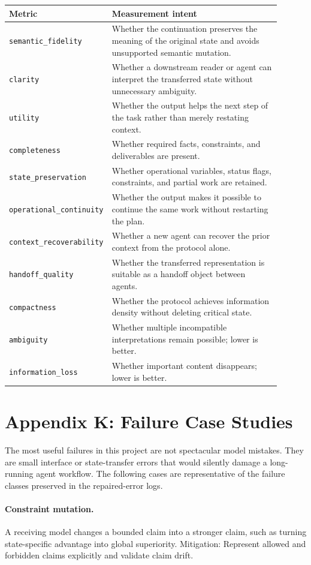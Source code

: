 \documentclass[11pt]{article}
\begin{document}
\begin{longtable}{p{0.28\linewidth}p{0.62\linewidth}}
\toprule
Metric & Measurement intent \\
\midrule
\endhead
\texttt{semantic\_fidelity} & Whether the continuation preserves the meaning of the original state and avoids unsupported semantic mutation. \\
\texttt{clarity} & Whether a downstream reader or agent can interpret the transferred state without unnecessary ambiguity. \\
\texttt{utility} & Whether the output helps the next step of the task rather than merely restating context. \\
\texttt{completeness} & Whether required facts, constraints, and deliverables are present. \\
\texttt{state\_preservation} & Whether operational variables, status flags, constraints, and partial work are retained. \\
\texttt{operational\_continuity} & Whether the output makes it possible to continue the same work without restarting the plan. \\
\texttt{context\_recoverability} & Whether a new agent can recover the prior context from the protocol alone. \\
\texttt{handoff\_quality} & Whether the transferred representation is suitable as a handoff object between agents. \\
\texttt{compactness} & Whether the protocol achieves information density without deleting critical state. \\
\texttt{ambiguity} & Whether multiple incompatible interpretations remain possible; lower is better. \\
\texttt{information\_loss} & Whether important content disappears; lower is better. \\
\bottomrule
\end{longtable}

\section{Appendix K: Failure Case Studies}
The most useful failures in this project are not spectacular model mistakes. They are small interface or state-transfer errors that would silently damage a long-running agent workflow. The following cases are representative of the failure classes preserved in the repaired-error logs.

\paragraph{Constraint mutation.} A receiving model changes a bounded claim into a stronger claim, such as turning state-specific advantage into global superiority. Mitigation: Represent allowed and forbidden claims explicitly and validate claim drift.
\end{document}
